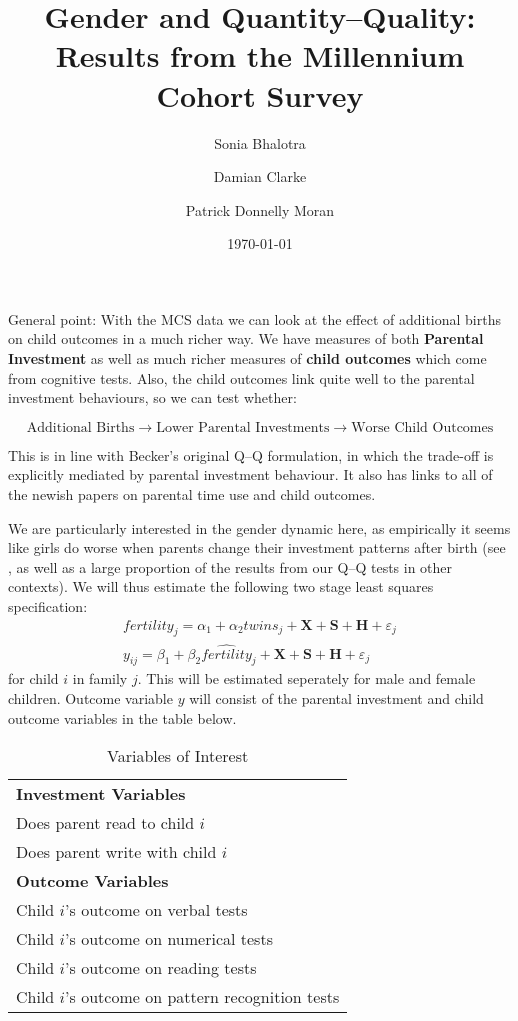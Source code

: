 \documentclass[a4paper, 11pt]{article}
\title{Gender and Quantity--Quality: Results from the Millennium Cohort Survey}
\author{Sonia Bhalotra \and Damian Clarke \and Patrick Donnelly Moran}
\date{\today}
\theoremstyle{plain}
\begin{document}
\sffamily
\maketitle

General point: With the MCS data we can look at the effect of additional births
on child outcomes in a much richer way.  We have measures of both
\textbf{Parental Investment} as well as much richer measures of
\textbf{child outcomes} which come from cognitive tests.  Also, the child
outcomes link quite well to the parental investment behaviours, so we can
test whether:

\[
\text{Additional Births}\rightarrow\text{Lower Parental Investments}\rightarrow\text{Worse Child Outcomes}
\] 

\noindent This is in line with Becker's original Q--Q formulation, in which the
trade-off is explicitly mediated by parental investment behaviour.  It also
has links to all of the newish papers on parental time use and child outcomes.

We are particularly interested in the gender dynamic here, as empirically it
seems like girls do worse when parents change their investment patterns after
birth (see \citet{Juhnetal2015}, as well as a large proportion of the results
from our Q--Q tests in other contexts).  We will thus estimate the following 
two stage least squares specification:
\begin{eqnarray}
  fertility_j = \alpha_1 + \alpha_2 twins_j + \bm{X} + \bm{S} + \bm{H} + \varepsilon_j \\
  y_{ij} = \beta_1 + \beta_2 \widehat{fertility}_j + \bm{X} + \bm{S} + \bm{H} + \varepsilon_j 
\end{eqnarray}
for child $i$ in family $j$.  This will be estimated seperately for male and female children.
Outcome variable $y$ will consist of the parental investment and child outcome variables in
the table below.
\begin{table}[htpb!]
\caption{Variables of Interest}
  \begin{tabular}{l} \toprule
  \textbf{Investment Variables}  \\
  Does parent read to child $i$  \\
  Does parent write with child $i$  \\
  \textbf{Outcome Variables}  \\
  Child $i$'s outcome on verbal tests \\
  Child $i$'s outcome on numerical tests \\
  Child $i$'s outcome on reading tests \\
  Child $i$'s outcome on pattern recognition tests \\
  \bottomrule
  \end{tabular}
\end{table}
\end{document}
